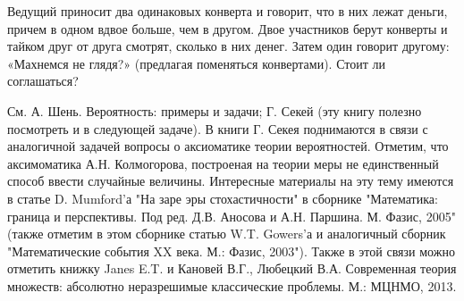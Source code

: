 \begin{comment}
\begin{problem}
Некто обладает одной облигацией, которую намеревается продать в один из последующих четырех дней, в которых цена облигации 
принимает различные значения, априори неизвестные, но становящиеся известными в начале каждого дня продаж. Предполагается, что 
цены облигации независимы и их перестановки по торговым дням равновозможны. Какова стратегия продавца, состоящая в выборе дня 
продажи облигации и гарантирующая максимальную вероятность того, что он продаст облигацию в день ее наибольшей цены? 
\end{problem}

\begin{ordre}
Рассмотреть следующие возможные стратегии и сравнить вероятности продажи облигации в день наибольшей цены: 
\begin{enumerate}
\item на первом шаге (в первый день торгов) запомним имевшую место цену облигации, не продавая ее, а затем продадим 
облигацию в тот день, когда ее цена окажется большей цены, зафиксированной в первый день, или (когда такого дня не окажется) в 
последний (четвертый) день, независимо от цены этого дня (стратегия $S_1$); 

\item не продавая облигацию в первом и втором торговых днях, зафиксируем  максимальную цену из двух, имевших место для этих дней, 
и продадим облигацию в третьем торговом дне, если цена облигации в нем будет выше, чем указанная зафиксированная максимальная цена, 
или, в противном случае, в четвертом дне (стратегия $S_2$). 
\end{enumerate}
\end{ordre}
\end{comment}

\begin{problem}
Ведущий приносит два одинаковых конверта и говорит, что в них лежат деньги, причем в одном вдвое больше, чем в другом. Двое участников берут конверты и тайком друг от друга смотрят, сколько в них денег. Затем один говорит другому: «Махнемся не глядя?» (предлагая поменяться конвертами). Стоит ли соглашаться?
\end{problem}
\begin{remark}
См. А. Шень. Вероятность: примеры и задачи; Г. Секей \cite{book12} (эту книгу полезно посмотреть и в следующей задаче). В книги Г. Секея поднимаются в связи с аналогичной задачей вопросы о аксиоматике теории вероятностей. Отметим, что аксимоматика А.Н. Колмогорова, построеная на теории меры не единственный способ ввести случайные величины. Интересные материалы на эту тему имеются в статье D. Mumford'а "На заре эры стохастичности" в сборнике "Математика: граница и перспективы. Под ред. Д.В. Аносова и А.Н. Паршина. М. Фазис, 2005" (также отметим в этом сборнике статью W.T. Gowers'а и аналогичный сборник "Математические события XX века. М.: Фазис, 2003"). Также в этой связи можно отметить книжку Janes E.T. \cite{200} и Кановей В.Г., Любецкий В.А. Современная теория множеств: абсолютно неразрешимые классические проблемы. М.: МЦНМО, 2013.  
\end{remark}

